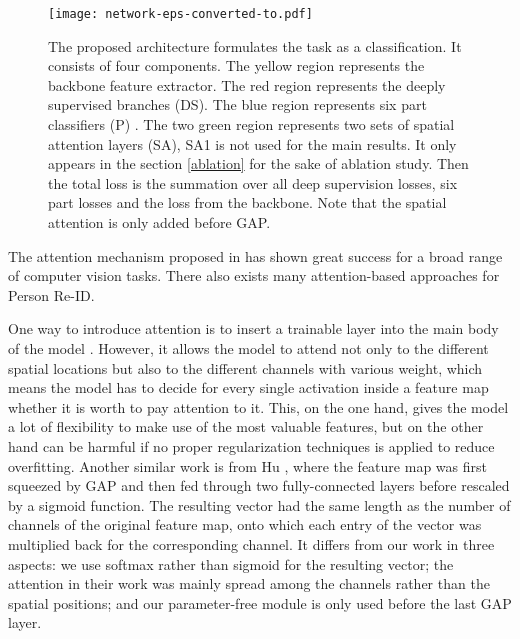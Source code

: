 \documentclass[10pt,twocolumn,letterpaper]{article}
\newcommand{\myparagraph}[1]{\vspace{3pt}\noindent{\bf #1}}
\begin{document}
\begin{figure*}[!ht]
  \centering
  \texttt{[image: network-eps-converted-to.pdf]}
  \caption{The proposed architecture formulates the task as a classification. It consists of four components. The yellow region represents the backbone feature extractor. The red region represents the deeply supervised branches (DS). The blue region represents six part classifiers (P) \cite{pcb}. The two green region represents two sets of spatial attention layers (SA), SA1 is not used for the main results. It only appears in the section \ref{ablation} for the sake of ablation study. Then the total loss is the summation over all deep supervision losses, six part losses and the loss from the backbone. Note that the spatial attention is only added before GAP.}
  \label{fig:train_arch}
\end{figure*}

\myparagraph{Attention in Person Re-ID.}
The attention mechanism proposed in \cite{attention_origin} has shown great success for a broad range of computer vision tasks. There also exists many attention-based approaches for Person Re-ID.

One way to introduce attention is to insert a trainable layer into the main body of the model \cite{atten_reid_harm}. However, it allows the model to attend not only to the different spatial locations but also to the different channels with various weight, which means the model has to decide for every single activation inside a feature map whether it is worth to pay attention to it. This, on the one hand, gives the model a lot of flexibility to make use of the most valuable features, but on the other hand can be harmful if no proper regularization techniques is applied to reduce overfitting. Another similar work is from Hu \etal \cite{senet}, where the feature map was first squeezed by GAP and then fed through two fully-connected layers before rescaled by a sigmoid function. The resulting vector had the same length as the number of channels of the original feature map, onto which each entry of the vector was multiplied back for the corresponding channel. It differs from our work in three aspects: we use softmax rather than sigmoid for the resulting vector; the attention in their work was mainly spread among the channels rather than the spatial positions; and our parameter-free module is only used before the last GAP layer.
\end{document}
